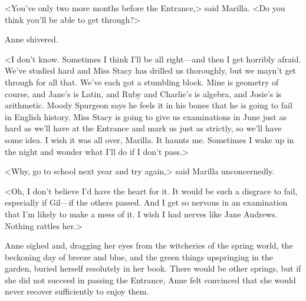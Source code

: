 <You've only two more months before the Entrance,> said Marilla. <Do you think you'll be able to get through?>

Anne shivered.

<I don't know. Sometimes I think I'll be all right—and then I get horribly afraid. We've studied hard and Miss Stacy has drilled us thoroughly, but we mayn't get through for all that. We've each got a stumbling block. Mine is geometry of course, and Jane's is Latin, and Ruby and Charlie's is algebra, and Josie's is arithmetic. Moody Spurgeon says he feels it in his bones that he is going to fail in English history. Miss Stacy is going to give us examinations in June just as hard as we'll have at the Entrance and mark us just as strictly, so we'll have some idea. I wish it was all over, Marilla. It haunts me. Sometimes I wake up in the night and wonder what I'll do if I don't pass.>

<Why, go to school next year and try again,> said Marilla unconcernedly.

<Oh, I don't believe I'd have the heart for it. It would be such a disgrace to fail, especially if Gil—if the others passed. And I get so nervous in an examination that I'm likely to make a mess of it. I wish I had nerves like Jane Andrews. Nothing rattles her.>

Anne sighed and, dragging her eyes from the witcheries of the spring world, the beckoning day of breeze and blue, and the green things upspringing in the garden, buried herself resolutely in her book. There would be other springs, but if she did not succeed in passing the Entrance, Anne felt convinced that she would never recover sufficiently to enjoy them.